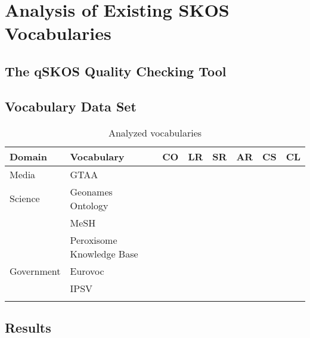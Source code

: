 
\section{Analysis of Existing SKOS Vocabularies}\label{sec:analysis}

\subsection{The qSKOS Quality Checking Tool}


\subsection{Vocabulary Data Set}

\begin{table}[h]
\caption{Analyzed vocabularies}
\begin{tabular}{|p{2.5cm}|p{6cm}|p{2cm}|p{.5cm}|p{.5cm}|p{.5cm}|p{.5cm}|p{.5cm}|}
\hline
\textbf{Domain} & \textbf{Vocabulary} & \textbf{CO} & \textbf{LR} & \textbf{SR} & \textbf{AR} & \textbf{CS} & \textbf{CL}\\
\hline
Media & GTAA & & & & & & \\
\hline
Science & Geonames Ontology &&&&&& \\
\hline
& MeSH &&&&&& \\
\hline
& Peroxisome Knowledge Base &&&&&& \\
\hline
Government & Eurovoc &&&&&& \\
\hline
& IPSV &&&&&& \\
\hline
\\
\hline

\end{tabular}
\end{table}


\subsection{Results}


